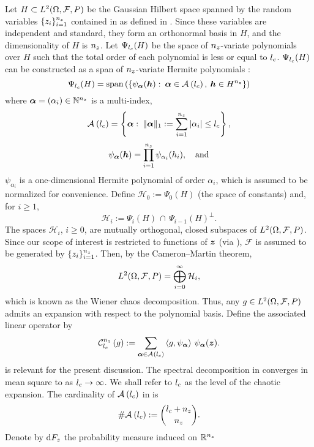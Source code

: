 Let $H \subset \L{2}(\Omega, \mathcal{F}, \probability)$ be the Gaussian Hilbert
space \cite{janson1997} spanned by the random variables $\{ \z_i \}_{i = 1}^\nz$
contained in \vz as defined in . Since these
variables are independent and standard, they form an orthonormal basis in $H$,
and the dimensionality of $H$ is $\nz$. Let $\Psi_\lc(H)$ be the space of
$\nz$-variate polynomials over $H$ such that the total order of each polynomial
is less or equal to $\lc$. $\Psi_\lc(H)$ can be constructed as a span of
$\nz$-variate Hermite polynomials \cite{maitre2010, eldred2008}:
\[
  \Psi_\lc(H) = \mathrm{span}\left(\left\{ \psi_{\multiindex}(\vh): \: \multiindex \in \multiindices{\lc}, \: \vh \in H^\nz \right\}\right)
\]
where $\multiindex = (\alpha_i) \in \natural^\nz$ is a multi-index,
\[
  \multiindices{\lc} = \left\{ \multiindex: \: \norm[1]{\multiindex} := \sum_{i = 1}^\nz |\alpha_i| \leq \lc \right\},
\]
\[
  \psi_{\multiindex}(\vh) = \prod_{i = 1}^\nz \psi_{\alpha_i}(\h_i), \hspace{1em} \text{and}
\]
$\psi_{\alpha_i}$ is a one-dimensional Hermite polynomial of order $\alpha_i$,
which is assumed to be normalized for convenience. Define $\mathcal{H}_0 :=
\Psi_0(H)$ (the space of constants) and, for $i \geq 1$,
\[
  \mathcal{H}_i := \Psi_i(H) \, \cap \, \Psi_{i - 1}(H)^\perp.
\]
The spaces $\mathcal{H}_i$, $i \geq 0$, are mutually orthogonal, closed
subspaces of $\L{2}(\Omega, \mathcal{F}, \probability)$. Since our scope of
interest is restricted to functions of $\vz$ (via
), $\mathcal{F}$ is assumed to be generated by
$\{ \z_i \}_{i = 1}^\nz$. Then, by the Cameron--Martin theorem,
\[
  \L{2}(\Omega, \mathcal{F}, \probability) = \bigoplus_{i = 0}^\infty \mathcal{H}_i,
\]
which is known as the Wiener chaos decomposition. Thus, any $\g \in
\L{2}(\Omega, \mathcal{F}, \probability)$ admits an expansion with
respect to the polynomial basis. Define the associated linear operator by
\[
  \chaos{\nz}{\lc}{\g} := \sum_{\multiindex \in
  \multiindices{\lc}} \innerproduct{\g}{\psi_{\multiindex}} \, \psi_{\multiindex}(\vz).
\]
 is relevant for the present discussion. The spectral
decomposition in  converges in mean square to \g as
$\lc \to \infty$. We shall refer to $\lc$ as the level of the chaotic expansion.
The cardinality of $\multiindices{\lc}$ in
 is
\[
  \cardinality{\multiindices{\lc}} := { \lc + \nz \choose \nz }.
\]
Denote by $\d F_\z$ the probability measure induced on $\real^\nz$

